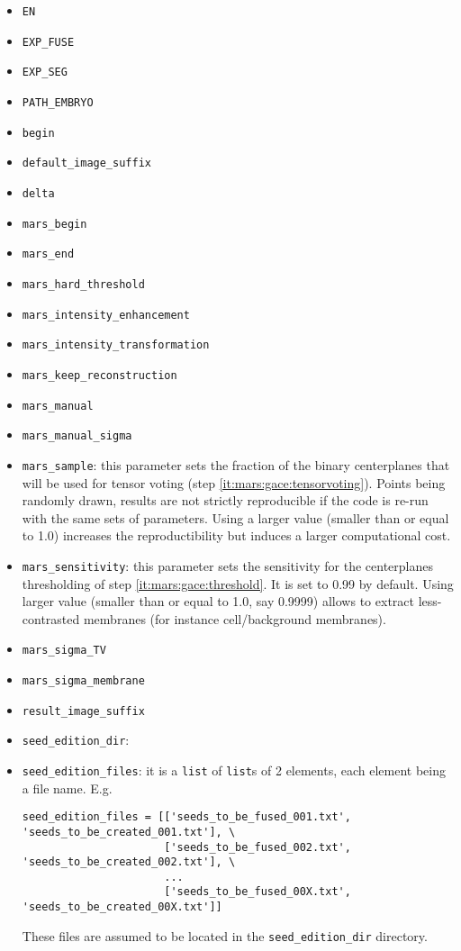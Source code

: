 \begin{itemize}
\itemsep -1ex
\item \texttt{EN}
\item \texttt{EXP\_FUSE}
\item \texttt{EXP\_SEG}
\item \texttt{PATH\_EMBRYO}
\item \texttt{begin}
\item \texttt{default\_image\_suffix}
\item \texttt{delta}
\item \texttt{mars\_begin}
\item \texttt{mars\_end}
\item \texttt{mars\_hard\_threshold}
\item \texttt{mars\_intensity\_enhancement}
\item \texttt{mars\_intensity\_transformation}
\item \texttt{mars\_keep\_reconstruction}
\item \texttt{mars\_manual}
\item \texttt{mars\_manual\_sigma}
\item \texttt{mars\_sample}: this parameter sets the fraction of the binary centerplanes that will be used for tensor voting (step \ref{it:mars:gace:tensorvoting}). Points being randomly drawn, results are not strictly reproducible if the code is re-run with the same sets of parameters. Using a larger value (smaller than or equal to 1.0) increases the reproductibility but induces a larger computational cost.
\item \texttt{mars\_sensitivity}: this parameter sets the sensitivity for the centerplanes thresholding of step \ref{it:mars:gace:threshold}. It is set to 0.99 by default. Using larger value (smaller than or equal to 1.0, say 0.9999) allows to extract less-contrasted membranes (for instance cell/background membranes).
\item \texttt{mars\_sigma\_TV}
\item \texttt{mars\_sigma\_membrane}
\item \texttt{result\_image\_suffix}
\item \texttt{seed\_edition\_dir}:
\item \texttt{seed\_edition\_files}: it is a \texttt{list} of \texttt{list}s of 2 elements, each element being a file name. E.g.
\begin{verbatim}
seed_edition_files = [['seeds_to_be_fused_001.txt', 'seeds_to_be_created_001.txt'], \
                      ['seeds_to_be_fused_002.txt', 'seeds_to_be_created_002.txt'], \
                      ...
                      ['seeds_to_be_fused_00X.txt', 'seeds_to_be_created_00X.txt']]
\end{verbatim}
These files are assumed to be located in the \texttt{seed\_edition\_dir} directory.


\end{itemize}

